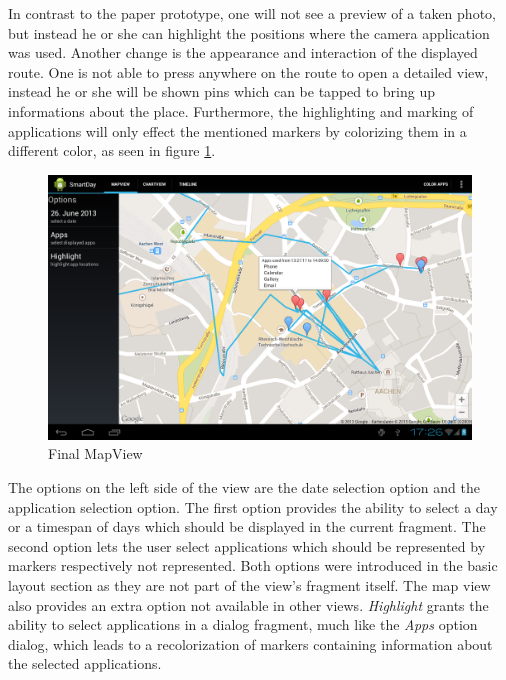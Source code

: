 In  contrast to the paper prototype, one will not see a preview of a taken photo, but instead he or she can highlight the positions where the camera application was used. Another change is the appearance and interaction of the displayed route. One is not able to press anywhere on the route to open a detailed view, instead he or she will be shown pins which can be tapped to bring up informations about the place. Furthermore, the highlighting and marking of applications will only effect the mentioned markers by colorizing them in a different color, as seen in figure \ref{fig:mapview}.
\begin{figure}[h]
	\caption{Final MapView}
	\label{fig:mapview}
	\includegraphics[width=\textwidth]{images/Screenshots/vfinal/Screenshot_2013-08-26-17-20-18.png}
\end{figure}

The  options on the left side of the view are the date selection option and the application selection option. The first option provides the ability to select a day or a timespan of days which should be displayed in the current fragment. The second option lets the user select applications which should be represented by markers respectively not represented. Both options were introduced in the basic layout section as they are not part of the view's fragment itself.
The map view also provides an extra option not available in other views. \emph{Highlight} grants the ability to select applications in a dialog fragment, much like the \emph{Apps} option dialog, which leads to a recolorization of markers containing information about the selected applications.

